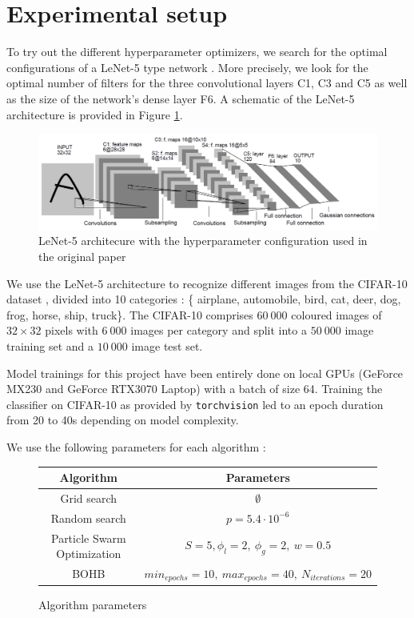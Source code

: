 \documentclass[a4 paper,11pt,2]{article}
\begin{document}
\section{Experimental setup}
To try out the different hyperparameter optimizers, we search for the optimal configurations of a LeNet-5 type network \cite{lecunGradientbasedLearningApplied1998}. More precisely, we look for the optimal number of filters for the three convolutional layers C1, C3 and C5 as well as the size of the network's dense layer F6. A schematic of the LeNet-5 architecture is provided in Figure \ref{fig:lenet}.

\begin{figure}[h]
\centering
\includegraphics[width = \linewidth]{ln5.png}
\caption{LeNet-5 architecure with the hyperparameter configuration used in the original paper}
\label{fig:lenet}
\end{figure}

We use the LeNet-5 architecture to recognize different images from the CIFAR-10 dataset \cite{krizhevskyLearningMultiplyeLayers2009}, divided into 10 categories : \{ airplane, automobile, bird, cat, deer, dog, frog, horse, ship, truck\}. The CIFAR-10 comprises $60\ 000$ coloured images of $32\times32$ pixels with $6\ 000$ images per category and split into a $50\ 000$ image training set and a $10\ 000$ image test set.

Model trainings for this project have been entirely done on local GPUs (GeForce MX230 and GeForce RTX3070 Laptop) with a batch of size 64. Training the classifier on CIFAR-10 as provided by \verb+torchvision+ led to an epoch duration from 20 to 40s depending on model complexity.

We use the following parameters for each algorithm :
\begin{figure}[h]
\centering
\begin{tabular}{|c|c|}
\hline Algorithm & Parameters \\
\hline Grid search & $\emptyset$ \\
Random search & $p = 5.4\cdot 10^{-6}$ \\
Particle Swarm Optimization & $S=5,\phi_l = 2,\ \phi_g = 2,\ w=0.5$\\
BOHB & $min_{epochs} = 10,\ max_{epochs} = 40,\ N_{iterations} = 20$\\
\hline
\end{tabular}
\label{tab:parameters}
\caption{Algorithm parameters}
\end{figure}
\end{document}
